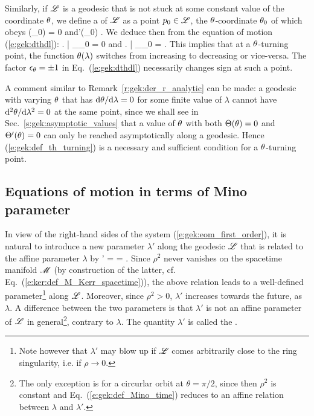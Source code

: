 Similarly, if $\mathscr{L}$ is a geodesic that is not stuck at some constant value of the
coordinate $\theta$, we define a  of $\mathscr{L}$ as a point $p_0\in\mathscr{L}$, the
$\theta$-coordinate $\theta_0$ of which obeys
\be \label{e:gek:def_th_turning}
    \Theta(\th_0) = 0 \quad\mbox{and}\quad \Theta'(\theta_0)  .
\ee
We deduce then from the equation of motion (\ref{e:gek:dthdl}):
\be \label{e:gek:der_th_turning}
   \left. \derd{\th}{\lambda} \right| _{\lambda_0} = 0
   \quad\mbox{and}\quad
   \left.  \right| _{\lambda_0} =   .
\ee
This implies that at a $\theta$-turning point, the function $\theta(\lambda)$
switches from increasing to decreasing or vice-versa. The factor $\epsilon_\theta=\pm 1$ in Eq.~(\ref{e:gek:dthdl}) necessarily
changes sign at such a point.

\begin{remark}
A comment similar to Remark~\ref{r:gek:der_r_analytic} can be made:
a geodesic with varying $\theta$ that has $\mathrm{d}\theta/\mathrm{d}\lambda = 0$ for some finite
value of $\lambda$
cannot have $\mathrm{d}^2\theta/\mathrm{d}\lambda^2 = 0$ at the same point, since we shall see
in Sec.~\ref{s:gek:asymptotic_values}
that a value of $\theta$ with both $\Theta(\theta)=0$
and $\Theta'(\theta)=0$ can only be reached asymptotically along a geodesic.
Hence (\ref{e:gek:def_th_turning})
is a necessary and sufficient condition for a $\theta$-turning point.
\end{remark}


\subsection{Equations of motion in terms of Mino parameter} \label{s:gek:Mino_time}

In view of the right-hand sides of the system (\ref{e:gek:eom_first_order}),
it is natural to introduce a new
parameter $\lambda'$
along the geodesic $\mathscr{L}$ that is related to the affine parameter $\lambda$ by
\be \label{e:gek:def_Mino_time}
    \D\lambda' = 
     =  .
\ee
Since $\rho^2$ never vanishes on the spacetime manifold $\mathscr{M}$ (by construction
of the latter, cf. Eq.~(\ref{e:ker:def_M_Kerr_spacetime})), the above relation
leads to a well-defined parameter\footnote{Note however that $\lambda'$ may blow up
if $\mathscr{L}$ comes arbitrarily close to the ring singularity, i.e. if $\rho\to 0$.} along $\mathscr{L}$.
Moreover, since $\rho^2>0$, $\lambda'$
increases towards the future, as $\lambda$. A difference between
the two parameters is that $\lambda'$ is not an affine parameter
of $\mathscr{L}$ in general\footnote{The only
exception is for a circurlar orbit at $\theta=\pi/2$, since then $\rho^2$
is constant and Eq.~(\ref{e:gek:def_Mino_time}) reduces to an affine relation
between $\lambda$ and $\lambda'$.}, contrary to $\lambda$.
The quantity $\lambda'$ is called the  \cite{Mino03}.

